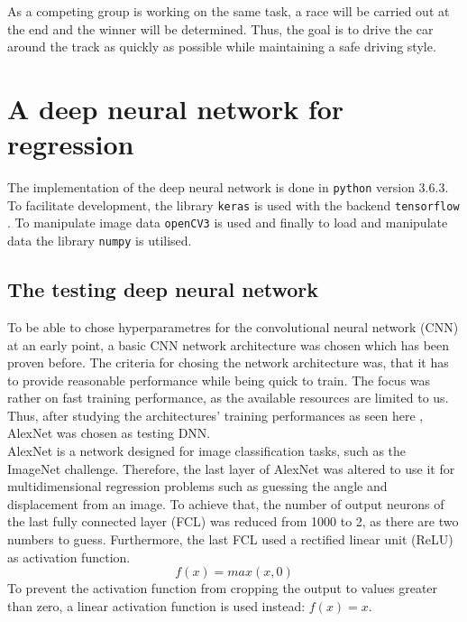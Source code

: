 \documentclass[10pt,a4paper,twoside,journal]{IEEEtran}
\begin{document}
As a competing group is working on the same task, a race will be carried out at the end and the winner will be determined. Thus, the goal is to drive the car around the track as quickly as possible while maintaining a safe driving style.



\section{A deep neural network for regression}
The implementation of the deep neural network is done in \texttt{python} version 3.6.3. To facilitate development, the library \texttt{keras} \cite{chollet2015keras} is used with the backend \texttt{tensorflow} \cite{tensorflow2015-whitepaper}. To manipulate image data \texttt{openCV3} \cite{opencv_library} is used and finally to load and manipulate data the library \texttt{numpy} \cite{5725236} is utilised. 

\subsection{The testing deep neural network}
\label{ssc:testing-dnn}
To be able to chose hyperparametres for the convolutional neural network (CNN) at an early point, a basic CNN network architecture was chosen which has been proven before. The criteria for chosing the network architecture was, that it has to provide reasonable performance while being quick to train. The focus was rather on fast training performance, as the available resources are limited to us. Thus, after studying the architectures' training performances as seen here \cite{jjohnson-cnn-benchmarks}, AlexNet \cite{alexnet2012imagenet} was chosen as testing DNN.\\

AlexNet is a network designed for image classification tasks, such as the ImageNet challenge. Therefore, the last layer of AlexNet was altered to use it for multidimensional regression problems such as guessing the angle and displacement from an image. To achieve that, the number of output neurons of the last fully connected layer (FCL) was reduced from 1000 to 2, as there are two numbers to guess. Furthermore, the last FCL used a rectified linear unit (ReLU) as activation function. 
\begin{equation}
	f(x) = max(x, 0)
\end{equation}
To prevent the activation function from cropping the output to values greater than zero, a linear activation function is used instead: $ f(x) = x $.
\end{document}
